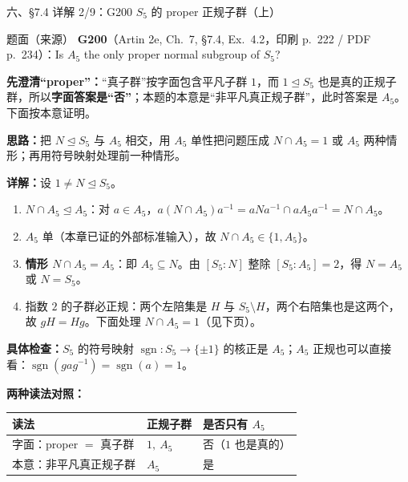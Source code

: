 \documentclass[aspectratio=169,10pt,fontset=none]{ctexbeamer}
\newcommand{\ex}[1]{\textcolor{accent}{\footnotesize\bfseries #1}}
\newcommand{\key}[1]{\textcolor{ink}{\bfseries #1}}
\begin{document}
\begin{frame}[t]{六、\S7.4 详解 2/9：G200 $S_5$ 的 proper 正规子群（上）}
\label{ex:G200}
\scriptsize
\begin{block}{\footnotesize 题面（来源）}
\ex{G200}（Artin 2e, Ch.~7, \S7.4, Ex.~4.2，印刷 p.~222 / PDF p.~234）：Is $A_5$ the only proper normal subgroup of $S_5$?
\end{block}
\key{先澄清“proper”：}“真子群”按字面包含平凡子群 $1$，而 $1\trianglelefteq S_5$ 也是真的正规子群，所以\textbf{字面答案是“否”}；本题的本意是“非平凡真正规子群”，此时答案是 $A_5$。下面按本意证明。

\key{思路：}把 $N\trianglelefteq S_5$ 与 $A_5$ 相交，用 $A_5$ 单性把问题压成 $N\cap A_5=1$ 或 $A_5$ 两种情形；再用符号映射处理前一种情形。

\key{详解：}设 $1\ne N\trianglelefteq S_5$。
\begin{enumerate}\setlength{\itemsep}{1pt}
\item $N\cap A_5\trianglelefteq A_5$：对 $a\in A_5$，$a(N\cap A_5)a^{-1}=aNa^{-1}\cap aA_5a^{-1}=N\cap A_5$。
\item $A_5$ 单（本章已证的外部标准输入），故 $N\cap A_5\in\{1,A_5\}$。
\item \textbf{情形 $N\cap A_5=A_5$}：即 $A_5\subseteq N$。由 $[S_5:N]$ 整除 $[S_5:A_5]=2$，得 $N=A_5$ 或 $N=S_5$。
\item 指数 $2$ 的子群必正规：两个左陪集是 $H$ 与 $S_5\setminus H$，两个右陪集也是这两个，故 $gH=Hg$。下面处理 $N\cap A_5=1$（见下页）。
\end{enumerate}
\key{具体检查：}$S_5$ 的符号映射 $\operatorname{sgn}:S_5\to\{\pm1\}$ 的核正是 $A_5$；$A_5$ 正规也可以直接看：$\operatorname{sgn}(gag^{-1})=\operatorname{sgn}(a)=1$。

\key{两种读法对照：}
\begin{center}
\begin{tabular}{@{}l l l@{}}
\toprule
读法 & 正规子群 & 是否只有 $A_5$\\
\midrule
字面：proper $=$ 真子群 & $1,\ A_5$ & 否（$1$ 也是真的）\\
本意：非平凡真正规子群 & $A_5$ & 是\\
\bottomrule
\end{tabular}
\end{center}
\end{frame}
\end{document}
